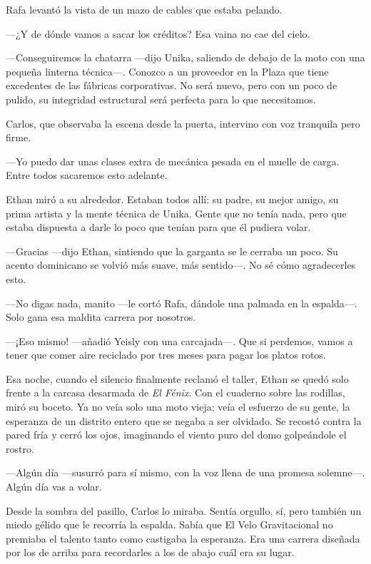 \documentclass[12pt,a4paper]{book}
\begin{document}
Rafa levantó la vista de un mazo de cables que estaba pelando.

---¿Y de dónde vamos a sacar los créditos? Esa vaina no cae del cielo.

---Conseguiremos la chatarra ---dijo Unika, saliendo de debajo de la moto con una pequeña linterna técnica---. Conozco a un proveedor en la Plaza que tiene excedentes de las fábricas corporativas. No será nuevo, pero con un poco de pulido, su integridad estructural será perfecta para lo que necesitamos.

Carlos, que observaba la escena desde la puerta, intervino con voz tranquila pero firme.

---Yo puedo dar unas clases extra de mecánica pesada en el muelle de carga. Entre todos sacaremos esto adelante.

Ethan miró a su alrededor. Estaban todos allí: su padre, su mejor amigo, su prima artista y la mente técnica de Unika. Gente que no tenía nada, pero que estaba dispuesta a darle lo poco que tenían para que él pudiera volar.

---Gracias ---dijo Ethan, sintiendo que la garganta se le cerraba un poco. Su acento dominicano se volvió más suave, más sentido---. No sé cómo agradecerles esto.

---No digas nada, manito ---le cortó Rafa, dándole una palmada en la espalda---. Solo gana esa maldita carrera por nosotros.

---¡Eso mismo! ---añadió Yeisly con una carcajada---. Que si perdemos, vamos a tener que comer aire reciclado por tres meses para pagar los platos rotos.

Esa noche, cuando el silencio finalmente reclamó el taller, Ethan se quedó solo frente a la carcasa desarmada de \textit{El Fénix}. Con el cuaderno sobre las rodillas, miró su boceto. Ya no veía solo una moto vieja; veía el esfuerzo de su gente, la esperanza de un distrito entero que se negaba a ser olvidado. Se recostó contra la pared fría y cerró los ojos, imaginando el viento puro del domo golpeándole el rostro.

---Algún día ---susurró para sí mismo, con la voz llena de una promesa solemne---. Algún día vas a volar.

Desde la sombra del pasillo, Carlos lo miraba. Sentía orgullo, sí, pero también un miedo gélido que le recorría la espalda. Sabía que El Velo Gravitacional no premiaba el talento tanto como castigaba la esperanza. Era una carrera diseñada por los de arriba para recordarles a los de abajo cuál era su lugar.
\end{document}
